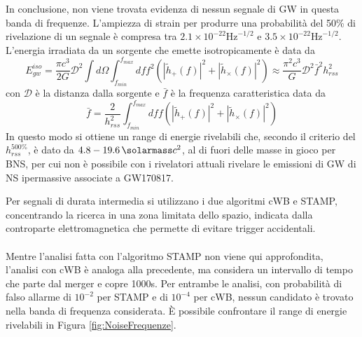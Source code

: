 In conclusione, non viene trovata evidenza di nessun segnale di GW in questa banda di frequenze.
L'ampiezza di strain per produrre una probabilità del 50\% di rivelazione di un segnale è compresa tra $2.1 \times 10^{-22} \text{Hz}^{-1/2}$ e $3.5 \times 10^{-22} \text{Hz}^{-1/2}$. L'energia irradiata da un sorgente che emette isotropicamente è data da 
\begin{equation}
	E_{gw}^{iso} = \frac{\pi c^3}{2G}\mathcal{D}^2\int d\Omega \int_{f_{min}}^{f_{max}}dff^2(|\tilde{h}_+(f)|^2 + |\tilde{h}_\times(f)|^2 ) \approx \frac{\pi^2 c^3}{G}\mathcal{D}^2\bar{f}^2h_{rss}^2
\end{equation}
con $\mathcal{D}$ è la distanza dalla sorgente e $\bar{f}$ è la frequenza caratteristica data da 
\begin{equation}
	\bar{f} = \frac{2}{h_{rss}^2}\int_{f_{min}}^{f_{max}}dff(|\tilde{h}_+(f)|^2 + |\tilde{h}_\times(f)|^2 )
\end{equation}
In questo modo si ottiene un range di energie rivelabili che, secondo il criterio del $h_{rss}^{500\%}$, è dato da $4.8-\SI{19.6}{\solarmass}c^2$, al di fuori delle masse in gioco per BNS, per cui non è possibile con i rivelatori attuali rivelare le emissioni di GW di NS ipermassive associate a GW170817.

Per segnali di durata intermedia si utilizzano i due algoritmi cWB e STAMP, concentrando la ricerca in una zona limitata dello spazio, indicata dalla controparte elettromagnetica che permette di evitare trigger accidentali.\\
\\
Mentre l'analisi fatta con l'algoritmo STAMP non viene qui approfondita, l'analisi con cWB è analoga alla precedente, ma considera un intervallo di tempo che parte dal merger e copre 1000s. Per entrambe le analisi, con probabilità di falso allarme di $10^{-2}$ per STAMP e di $10^{-4}$ per cWB, nessun candidato è trovato nella banda di frequenza considerata. È possibile confrontare il range di energie rivelabili in Figura \ref{fig:NoiseFrequenze}.

